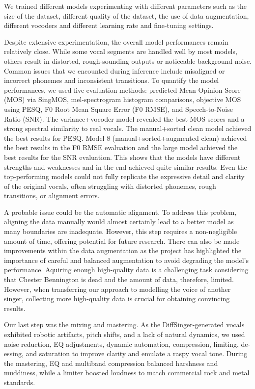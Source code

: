 \documentclass[a4paper]{article}
\begin{document}
	We trained different models experimenting with different parameters such as the size of the dataset, different quality of the dataset, the use of data augmentation, different vocoders and different learning rate and fine-tuning settings.
	
	
	Despite extensive experimentation, the overall model performances remain relatively close. While some vocal segments are handled well by most models, others result in distorted, rough-sounding outputs or noticeable background noise. Common issues that we encounted during inference include misaligned or incorrect phonemes and inconsistent transitions. To quantify the model performances, we used five evaluation methods: predicted Mean Opinion Score (MOS) via SingMOS, mel-spectrogram histogram comparisons, objective MOS using PESQ, F0 Root Mean Square Error (F0 RMSE), and Speech-to-Noise Ratio (SNR). The variance+vocoder model revealed the best MOS scores and a strong spectral similarity to real vocals. The manual+sorted clean model achieved the best results for PESQ. Model 8 (manual+sorted+augmented clean) achieved the best results in the F0 RMSE evaluation and the large model achieved the best results for the SNR evaluation. This shows that the models have different strengths and weaknesses and in the end achieved quite similar results. Even the top-performing models could not fully replicate the expressive detail and clarity of the original vocals, often struggling with distorted phonemes, rough transitions, or alignment errors. 
	
	A probable issue could be the automatic alignment. To address this problem, aligning the data manually would almost certainly lead to a better model as many boundaries are inadequate. However, this step requires a non-negligible amount of time, offering potential for future research. There can also be made improvements within the data augmentation as the project has highlighted the importance of careful and balanced augmentation to avoid degrading the model’s performance. Aquiring enough high-quality data is a challenging task considering that Chester Bennington is dead and the amount of data, therefore, limited. However, when transferring our approach to modelling the voice of another singer, collecting more high-quality data is crucial for obtaining convincing results.
	
	Our last step was the mixing and mastering. As the DiffSinger-generated vocals exhibited robotic artifacts, pitch shifts, and a lack of natural dynamics, we used noise reduction, EQ adjustments, dynamic automation, compression, limiting, de-essing, and saturation to improve clarity and emulate a raspy vocal tone. During the mastering, EQ and multiband compression balanced harshness and muddiness, while a limiter boosted loudness to match commercial rock and metal standards. 
	
\end{document}
